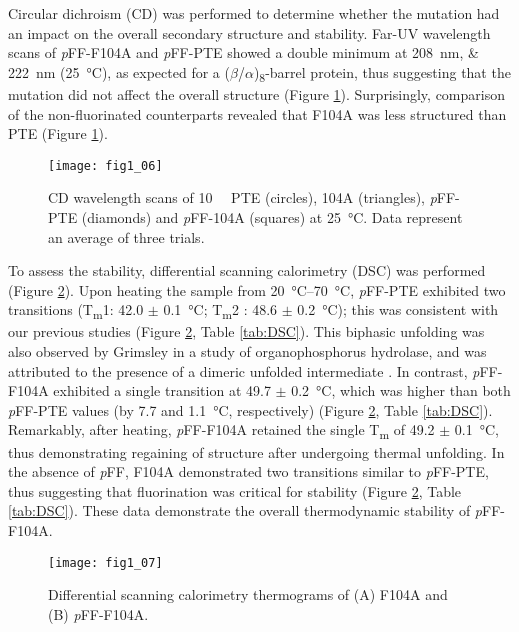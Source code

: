 \begin{refsection}
Circular dichroism (CD) was performed to determine whether the mutation had an
impact on the overall secondary structure and stability. Far-UV wavelength
scans of \emph{p}FF-F104A and \emph{p}FF-PTE showed a double minimum at
\SIlist{208;222}{\nm} (\SI{25}{\celsius}), as expected for a
($\beta$/$\alpha$)\textsubscript{8}-barrel protein, thus suggesting that the
mutation did not affect the overall structure (Figure \ref{fig:CD-fig}).
Surprisingly, comparison of the non-fluorinated counterparts revealed that
F104A was less structured than PTE (Figure \ref{fig:CD-fig}). 
\begin{figure}[htbp] \centering \texttt{[image: fig1\_06]}
    \caption[CD wavelength scans of \SI{10}{\micro\Molar} PTE (circles), 104A (triangles),
    \emph{p}FF-PTE (diamonds) and \emph{p}FF-104A (squares) at
\SI{25}{\celsius}. Data represent an average of three trials.]{CD wavelength
    scans of \SI{10}{\micro\Molar} PTE (circles), 104A (triangles),
    \emph{p}FF-PTE (diamonds) and \emph{p}FF-104A (squares) at
    \SI{25}{\celsius}. Data represent an average of three trials.}
    \label{fig:CD-fig} 
\end{figure}

To assess the stability, differential scanning calorimetry (DSC) was performed
(Figure \ref{fig:DSC-fig}). Upon heating the sample from
\SIrange{20}{70}{\celsius}, \emph{p}FF-PTE exhibited two transitions
(T\textsubscript{m}1: 42.0 $\pm$ \SI{0.1}{\celsius}; T\textsubscript{m}2 : 48.6
$\pm$ \SI{0.2}{\celsius}); this was consistent with our previous studies
\cite{Baker2011b} (Figure \ref{fig:DSC-fig}, Table \ref{tab:DSC}). This
biphasic unfolding was also observed by Grimsley   in a study of
organophosphorus hydrolase, and was attributed to the presence of a dimeric
unfolded intermediate \cite{Grimsley1997b}. In contrast, \emph{p}FF-F104A
exhibited a single transition at 49.7 $\pm$ \SI{0.2}{\celsius}, which was
higher than both \emph{p}FF-PTE values (by 7.7 and \SI{1.1}{\celsius},
respectively) (Figure \ref{fig:DSC-fig}, Table \ref{tab:DSC}). Remarkably,
after heating, \emph{p}FF-F104A retained the single T\textsubscript{m} of 49.2
$\pm$ \SI{0.1}{\celsius}, thus demonstrating regaining of structure after
undergoing thermal unfolding.  In the absence of \emph{p}FF, F104A demonstrated
two transitions similar to \emph{p}FF-PTE, thus suggesting that fluorination
was critical for stability (Figure \ref{fig:DSC-fig}, Table \ref{tab:DSC}).
These data demonstrate the overall thermodynamic stability of \emph{p}FF-F104A.
\begin{figure}[htbp] \centering \texttt{[image: fig1\_07]}
    \caption[Differential scanning calorimetry thermograms of (A) F104A and (B)
    \emph{p}FF-F104A.]{Differential scanning calorimetry thermograms of (A)
        F104A and (B) \emph{p}FF-F104A.} \label{fig:DSC-fig} 
\end{figure}


\end{refsection}
